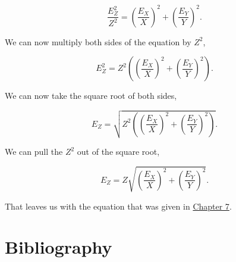 \documentclass[
  openany]{krantz}
\begin{document}
\[\frac{E_Z^2}{Z^2} = \left(\frac{E_X}{X}\right)^2 +\left(\frac{E_Y}{Y}\right)^2.\]

We can now multiply both sides of the equation by \(Z^2\),

\[E_Z^2 = Z^2 \left(\left(\frac{E_X}{X}\right)^2 +\left(\frac{E_Y}{Y}\right)^2 \right).\]

We can now take the square root of both sides,

\[E_Z = \sqrt{ Z^2 \left( \left( \frac{E_X}{X}\right)^2 + \left(\frac{E_Y}{Y}\right)^2 \right) }.\]

We can pull the \(Z^2\) out of the square root,

\[E_Z = Z \sqrt{\left( \frac{E_X}{X}\right)^2 + \left(\frac{E_Y}{Y}\right)^2}.\]

That leaves us with the equation that was given in \protect\hyperlink{Chapter_7}{Chapter 7}.

\backmatter

\hypertarget{bibliography}{%
\chapter*{Bibliography}\label{bibliography}}
\end{document}
